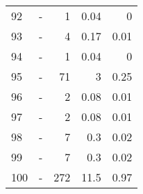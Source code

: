 \begin{longtable}{lXrrr}
        92 & \multicolumn{1}{X}{-} & %
          \num{1} &
          \num[round-mode=places,round-precision=2]{0.04} &
          \num[round-mode=places,round-precision=2]{0} \\

        93 & \multicolumn{1}{X}{-} & %
          \num{4} &
          \num[round-mode=places,round-precision=2]{0.17} &
          \num[round-mode=places,round-precision=2]{0.01} \\

        94 & \multicolumn{1}{X}{-} & %
          \num{1} &
          \num[round-mode=places,round-precision=2]{0.04} &
          \num[round-mode=places,round-precision=2]{0} \\

        95 & \multicolumn{1}{X}{-} & %
          \num{71} &
          \num[round-mode=places,round-precision=2]{3} &
          \num[round-mode=places,round-precision=2]{0.25} \\

        96 & \multicolumn{1}{X}{-} & %
          \num{2} &
          \num[round-mode=places,round-precision=2]{0.08} &
          \num[round-mode=places,round-precision=2]{0.01} \\

        97 & \multicolumn{1}{X}{-} & %
          \num{2} &
          \num[round-mode=places,round-precision=2]{0.08} &
          \num[round-mode=places,round-precision=2]{0.01} \\

        98 & \multicolumn{1}{X}{-} & %
          \num{7} &
          \num[round-mode=places,round-precision=2]{0.3} &
          \num[round-mode=places,round-precision=2]{0.02} \\

        99 & \multicolumn{1}{X}{-} & %
          \num{7} &
          \num[round-mode=places,round-precision=2]{0.3} &
          \num[round-mode=places,round-precision=2]{0.02} \\

        100 & \multicolumn{1}{X}{-} & %
          \num{272} &
          \num[round-mode=places,round-precision=2]{11.5} &
          \num[round-mode=places,round-precision=2]{0.97} \\


\end{longtable}
